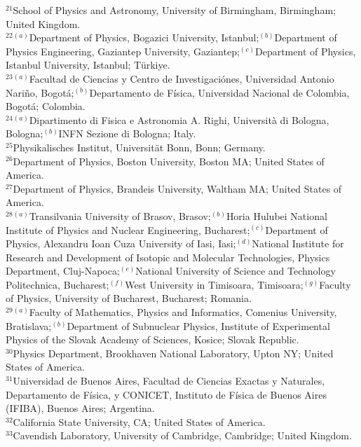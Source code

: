 \documentclass[PAPER, atlasdraft=false, USenglish, cernpreprint]{atlasdoc}
\begin{document}
\begin{flushleft}
$^{21}$School of Physics and Astronomy, University of Birmingham, Birmingham; United Kingdom.\\
$^{22}$$^{(a)}$Department of Physics, Bogazici University, Istanbul;$^{(b)}$Department of Physics Engineering, Gaziantep University, Gaziantep;$^{(c)}$Department of Physics, Istanbul University, Istanbul; T\"urkiye.\\
$^{23}$$^{(a)}$Facultad de Ciencias y Centro de Investigaci\'ones, Universidad Antonio Nari\~no, Bogot\'a;$^{(b)}$Departamento de F\'isica, Universidad Nacional de Colombia, Bogot\'a; Colombia.\\
$^{24}$$^{(a)}$Dipartimento di Fisica e Astronomia A. Righi, Università di Bologna, Bologna;$^{(b)}$INFN Sezione di Bologna; Italy.\\
$^{25}$Physikalisches Institut, Universit\"{a}t Bonn, Bonn; Germany.\\
$^{26}$Department of Physics, Boston University, Boston MA; United States of America.\\
$^{27}$Department of Physics, Brandeis University, Waltham MA; United States of America.\\
$^{28}$$^{(a)}$Transilvania University of Brasov, Brasov;$^{(b)}$Horia Hulubei National Institute of Physics and Nuclear Engineering, Bucharest;$^{(c)}$Department of Physics, Alexandru Ioan Cuza University of Iasi, Iasi;$^{(d)}$National Institute for Research and Development of Isotopic and Molecular Technologies, Physics Department, Cluj-Napoca;$^{(e)}$National University of Science and Technology Politechnica, Bucharest;$^{(f)}$West University in Timisoara, Timisoara;$^{(g)}$Faculty of Physics, University of Bucharest, Bucharest; Romania.\\
$^{29}$$^{(a)}$Faculty of Mathematics, Physics and Informatics, Comenius University, Bratislava;$^{(b)}$Department of Subnuclear Physics, Institute of Experimental Physics of the Slovak Academy of Sciences, Kosice; Slovak Republic.\\
$^{30}$Physics Department, Brookhaven National Laboratory, Upton NY; United States of America.\\
$^{31}$Universidad de Buenos Aires, Facultad de Ciencias Exactas y Naturales, Departamento de F\'isica, y CONICET, Instituto de Física de Buenos Aires (IFIBA), Buenos Aires; Argentina.\\
$^{32}$California State University, CA; United States of America.\\
$^{33}$Cavendish Laboratory, University of Cambridge, Cambridge; United Kingdom.\\
$$
\end{flushleft}
\end{document}
